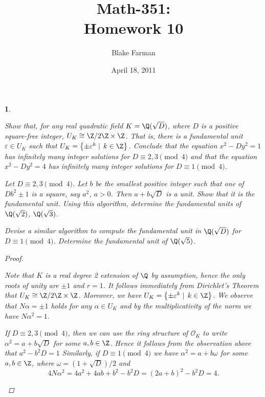 \documentclass[10pt]{amsart}
\author{Blake Farman}
\title{Math-351:\\Homework 10}
\date{April 18, 2011}
\begin{document}
\maketitle

\newtheorem{thm}{}

\newcommand{\OO}{\mathcal{O}}
\renewcommand{\epsilon}{\varepsilon}
\begin{thm}
  \label{Ex1}
  \begin{alphaenum}
  \item
    Show that, for any real quadratic field $K = \Q(\sqrt{D})$, where $D$ is a positive square-free integer, $U_K \cong \Z/2\Z \times \Z$.
    That is, there is a fundamental unit $\epsilon \in U_K$ such that $U_K = \left\{ \pm \epsilon^k \mid\, k\in\Z\right\}$.
    Conclude that the equation $x^2 - Dy^2 = 1$ has infinitely many integer solutions for $D \equiv 2,3 \pmod{4}$ and that the equation $x^2 - Dy^2 = 4$ has infinitely many integer solutions for $D \equiv 1 \pmod{4}$.
  \item
    Let $D \equiv 2,3 \pmod{4}$.
    Let $b$ be the smallest positive integer such that one of $Db^2 \pm 1$ is a square, say $a^2$, $a > 0$.
    Then $a + b \sqrt{D}$ is a unit.
    Show that it is the fundamental unit.
    Using this algorithm, determine the fundamental units of $\Q(\sqrt{2})$, $\Q(\sqrt{3})$.
  \item
    Devise a similar algorithm to compute the fundamental unit in $\Q(\sqrt{D})$ for $D \equiv 1 \pmod{4}$.
    Determine the fundamental unit of $\Q(\sqrt{5})$.
  \end{alphaenum}
  
  \begin{proof}
    \begin{alphaenum}
    \item
      Note that $K$ is a real degree 2 extension of $\Q$ by assumption, hence the only roots of unity are $\pm 1$ and $r = 1$.
      It follows immediately from Dirichlet's Theorem that $U_K \cong \Z/2\Z \times \Z$.
      Moreover, we have $U_K = \left\{\pm \epsilon^k \mid\, k \in \Z\right\}$.
      We observe that $N\alpha = \pm1$ holds for any $\alpha \in U_K$ and by the multiplicativity of the norm we have $N\alpha^2 = 1$.
      
      If $D \equiv 2,3 \pmod{4}$, then we can use the ring structure of $\OO_K$ to write $\alpha^2 = a + b\sqrt{D}$ for some $a,b \in \Z$.
      Hence it follows from the observation above that $a^2 - b^2D = 1$
      Similarly, if $D \equiv 1 \pmod{4}$ we have $\alpha^2 = a + b\omega$ for some $a,b \in \Z$, where $\omega = (1 + \sqrt{D})/2$ and 
      $$4N\alpha^2 = 4a^2 + 4ab + b^2 - b^2D = (2a + b)^2 - b^2D = 4.$$
      

\end{alphaenum}
\end{proof}
\end{thm}
\end{document}
